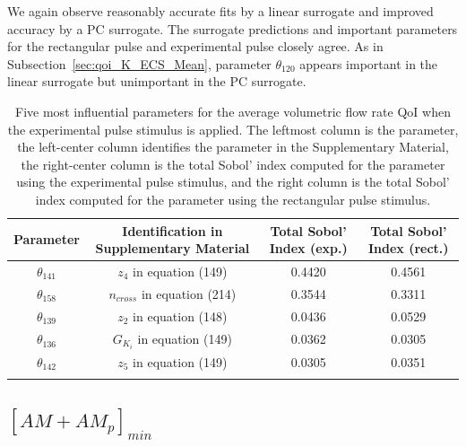We again observe reasonably accurate fits by a linear surrogate and improved accuracy by a PC surrogate. The surrogate predictions and important parameters for the rectangular pulse and experimental pulse closely agree.  As in Subsection~\ref{sec:qoi_K_ECS_Mean}, parameter $\theta_{120}$ appears important in the linear surrogate but unimportant in the PC surrogate.

\begin{table}[h]
\centering
{}
\begin{tabular}{cccc}
\toprule
Parameter & Identification in Supplementary Material & Total Sobol' Index (exp.) & Total Sobol' Index (rect.) \\
\midrule
$\theta_{141}$ &  $z_4$ in equation (149)  & 0.4420 & 0.4561\\
$\theta_{158}$ & $n_{cross}$ in equation (214)   & 0.3544 & 0.3311\\ 
 $\theta_{139}$ & $z_2$ in equation (148)  & 0.0436 & 0.0529\\
$\theta_{136}$ & $G_{K_i}$ in equation (149)   & 0.0362 & 0.0305\\
$\theta_{142}$ & $z_5$ in equation (149)   &  0.0305 & 0.0351\\
   \arrayrulecolor{black}\bottomrule
\end{tabular}
\caption{Five most influential parameters for the average volumetric flow rate QoI when the experimental pulse stimulus is applied. The leftmost column is the parameter, the left-center column identifies the parameter in the Supplementary Material, the right-center column is the total Sobol' index computed for the parameter using the experimental pulse stimulus, and the right column is the total Sobol' index computed for the parameter using the rectangular pulse stimulus.}
\label{tab:qoi_vol_flow}
\end{table}

\subsection{$[AM+AM_p]_{min}$}

